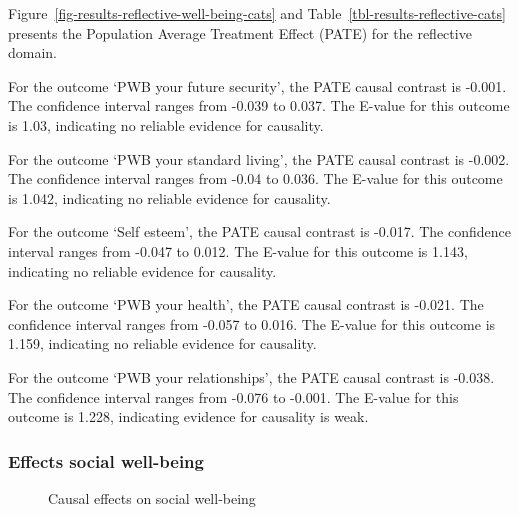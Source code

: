\documentclass[
  singlecolumn,
  9pt]{article}
\begin{document}
\begin{table}
{\addtocounter{table}{-1}

}

\end{table}%

Figure~\ref{fig-results-reflective-well-being-cats} and
Table~\ref{tbl-results-reflective-cats} presents the Population Average
Treatment Effect (PATE) for the reflective domain.

For the outcome `PWB your future security', the PATE causal contrast is
-0.001. The confidence interval ranges from -0.039 to 0.037. The E-value
for this outcome is 1.03, indicating no reliable evidence for causality.

For the outcome `PWB your standard living', the PATE causal contrast is
-0.002. The confidence interval ranges from -0.04 to 0.036. The E-value
for this outcome is 1.042, indicating no reliable evidence for
causality.

For the outcome `Self esteem', the PATE causal contrast is -0.017. The
confidence interval ranges from -0.047 to 0.012. The E-value for this
outcome is 1.143, indicating no reliable evidence for causality.

For the outcome `PWB your health', the PATE causal contrast is -0.021.
The confidence interval ranges from -0.057 to 0.016. The E-value for
this outcome is 1.159, indicating no reliable evidence for causality.

For the outcome `PWB your relationships', the PATE causal contrast is
-0.038. The confidence interval ranges from -0.076 to -0.001. The
E-value for this outcome is 1.228, indicating evidence for causality is
weak.

\newpage{}

\subsubsection{Effects social
well-being}\label{effects-social-well-being}

\begin{figure}


\caption{\label{fig-results-social-wellbeing-cats}Causal effects on
social well-being}

\end{figure}%

\newpage{}
\end{document}
